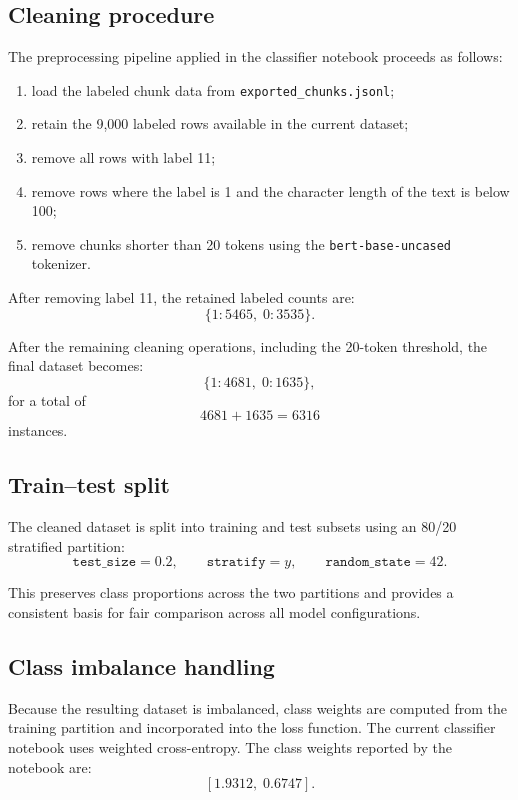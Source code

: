 \documentclass[11pt]{article}
\begin{document}
\subsection{Cleaning procedure}

The preprocessing pipeline applied in the classifier notebook proceeds as follows:
\begin{enumerate}
    \item load the labeled chunk data from \texttt{exported\_chunks.jsonl};
    \item retain the 9{,}000 labeled rows available in the current dataset;
    \item remove all rows with label 11;
    \item remove rows where the label is 1 and the character length of the text is below 100;
    \item remove chunks shorter than 20 tokens using the \texttt{bert-base-uncased} tokenizer.
\end{enumerate}

After removing label 11, the retained labeled counts are:
\[
\{1: 5465,\; 0: 3535\}.
\]

After the remaining cleaning operations, including the 20-token threshold, the final dataset becomes:
\[
\{1: 4681,\; 0: 1635\},
\]
for a total of
\[
4681 + 1635 = 6316
\]
instances.

\subsection{Train--test split}

The cleaned dataset is split into training and test subsets using an 80/20 stratified partition:
\[
\texttt{test\_size} = 0.2,\qquad \texttt{stratify} = y,\qquad \texttt{random\_state} = 42.
\]

This preserves class proportions across the two partitions and provides a consistent basis for fair comparison across all model configurations.

\subsection{Class imbalance handling}

Because the resulting dataset is imbalanced, class weights are computed from the training partition and incorporated into the loss function. The current classifier notebook uses weighted cross-entropy. The class weights reported by the notebook are:
\[
[1.9312,\; 0.6747].
\]
\end{document}
